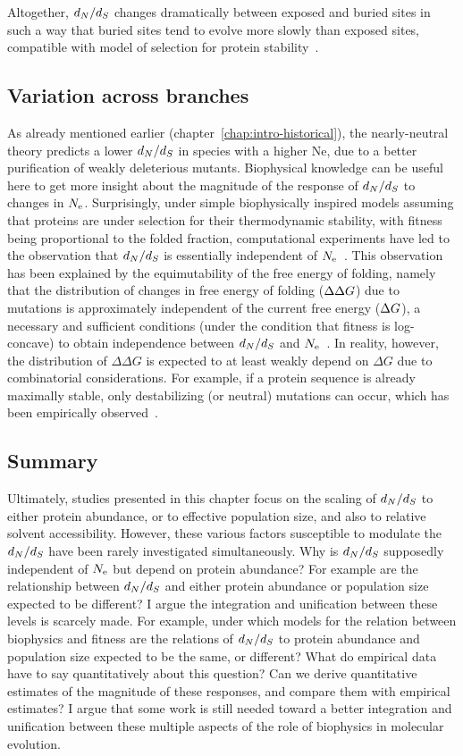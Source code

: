 Altogether, $d_N / d_S$ changes dramatically between exposed and buried sites in such a way that buried sites tend to evolve more slowly than exposed sites, compatible with model of selection for protein stability~\citep{Echave2016}.

\subsection{Variation across branches}
\label{subsec:thermo-variation-across-branches}

As already mentioned earlier (chapter~\ref{chap:intro-historical}), the nearly-neutral theory predicts a lower $d_N / d_S$ in species with a higher Ne, due to a better purification of weakly deleterious mutants.
Biophysical knowledge can be useful here to get more insight about the magnitude of the response of $d_N / d_S$ to changes in $N_{\textrm{e}}$.
Surprisingly, under simple biophysically inspired models assuming that proteins are under selection for their thermodynamic stability, with fitness being proportional to the folded fraction, computational experiments have led to the observation that $d_N / d_S$ is essentially independent of $N_{\textrm{e}}$~\citep{Goldstein2013}.
This observation has been explained by the equimutability of the free energy of folding, namely that the distribution of changes in free energy of folding ($\Delta \Delta G$) due to mutations is approximately independent of the current free energy ($\Delta G$), a necessary and sufficient conditions (under the condition that fitness is log-concave) to obtain independence between $d_N / d_S$ and $N_{\textrm{e}}$~\citep{Cherry1998}.
In reality, however, the distribution of $\Delta \Delta G$ is expected to at least weakly depend on $\Delta G$ due to combinatorial considerations.
For example, if a protein sequence is already maximally stable, only destabilizing (or neutral) mutations can occur, which has been empirically observed~\citep{Serohijos2012}.

\subsection{Summary}

Ultimately, studies presented in this chapter focus on the scaling of $d_N / d_S$ to either protein abundance, or to effective population size, and also to relative solvent accessibility.
However, these various factors susceptible to modulate the $d_N / d_S$ have been rarely investigated simultaneously.
Why is $d_N / d_S$ supposedly independent of $N_{\textrm{e}}$ but depend on protein abundance?
For example are the relationship between $d_N / d_S$ and either protein abundance or population size expected to be different?
I argue the integration and unification between these levels is scarcely made.
For example, under which models for the relation between biophysics and fitness are the relations of $d_N / d_S$ to protein abundance and population size expected to be the same, or different?
What do empirical data have to say quantitatively about this question?
Can we derive quantitative estimates of the magnitude of these responses, and compare them with empirical estimates?
I argue that some work is still needed toward a better integration and unification between these multiple aspects of the role of biophysics in molecular evolution.

